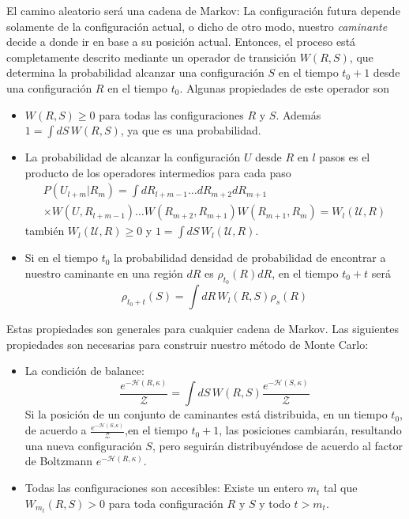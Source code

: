 El camino aleatorio será una cadena de Markov: La configuración futura
depende solamente de la configuración actual, o dicho de otro modo, nuestro
\textit{caminante} decide a donde ir en base a su posición actual. Entonces,
el proceso está completamente descrito mediante un operador 
de transición $W(R,S)$, que determina la probabilidad
alcanzar una configuración $S$ en el tiempo $t_0+1$ desde una
configuración $R$ en el tiempo $t_0$. Algunas propiedades de este
operador son 
\begin{itemize}
\item $W(R,S)\geq 0$ para todas las configuraciones
  $R$ y $S$. Además $1=\int
  dS\,W(R,S) $, ya que es una probabilidad.
\item La probabilidad de alcanzar la configuración $U$ desde
  $R$ en $l$ pasos es el producto de los operadores intermedios para cada paso 
  \begin{multline*}
    P(U_{l+m}|R_m)=\int
  dR_{l+m-1}\dots dR_{m+2}
  dR_{m+1}\\\times W(U,R_{l+m-1})\dots
  W(R_{m+2},R_{m+1}) W(R_{m+1},R_{m})=W_l(\mathcal{U},R)
  \end{multline*}
  también $W_l(\mathcal{U},R) \geq 0$ y $1=\int
  dS\, W_l(\mathcal{U},R)$.
\item Si en el tiempo $t_0$ la probabilidad densidad de probabilidad de
  encontrar a nuestro caminante en una región $dR$ es $\rho_{t_0}(R)dR$, en el tiempo $t_0+t$ será
\begin{equation*}
\rho_{t_0+t}(S)=\int
  dR\, W_l(R,S)\rho_s(R)
\end{equation*}
\end{itemize}
Estas propiedades son generales para cualquier cadena de Markov. Las
siguientes propiedades son necesarias para construir nuestro método de Monte
Carlo:
\begin{itemize}
\item La condición de balance:
  \begin{equation}\label{ecuacion_balance}
    \frac{e^{-\mathcal{H}(R,\kappa)}}{\mathcal{Z}}=\int
    dS\, W(R,S)\frac{e^{-\mathcal{H}(S,\kappa)}}{\mathcal{Z}}
  \end{equation}
  Si la posición de un conjunto de caminantes está distribuida, en un tiempo
  $t_0$, de acuerdo a $\frac{e^{-\mathcal{H}(S,\kappa)}}{\mathcal{Z}}$,en el
  tiempo $t_0+1$, las posiciones cambiarán, resultando una nueva configuración
  $S$, pero seguirán distribuyéndose de acuerdo al factor de Boltzmann $e^{-\mathcal{H}(R,\kappa)}$.
\item Todas las configuraciones son accesibles: Existe un entero $m_t$ tal que
  $W_{m_t}(R,S)>0$ para toda configuración $R$ y $S$ y todo $t>m_t$. 
\end{itemize}

